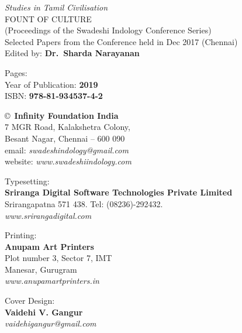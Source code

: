 \thispagestyle{empty}

\noindent
{\fontsize{9}{11}\selectfont\sl Studies in Tamil Civilisation}\\
FOUNT OF CULTURE\\
(Proceedings of the Swadeshi Indology Conference Series)\\
Selected Papers from the Conference held in Dec 2017 (Chennai)\\
Edited by: {\bf Dr.\ Sharda Narayanan}
\vfill

\noindent
Pages: {\bf\pageref{bookend}}\\
Year of Publication: {\bf 2019}\\
ISBN: {\bf 978-81-934537-4-2}\\
\vfill

\noindent
\copyright\ {\bf Infinity Foundation India}\\ 
7 MGR Road, Kalakshetra Colony,\\ 
Besant Nagar, Chennai -- 600 090\\
email: {\sl swadeshindology@gmail.com}\\
website: {\sl www.swadeshiindology.com} 
\vfill

\noindent
Typesetting:\\ 
{\bf Sriranga Digital Software Technologies Private Limited}\\ 
Srirangapatna 571 438. Tel: (08236)-292432.\\
{\sl www.srirangadigital.com}
\vfill

\noindent
Printing:\\
{\bf Anupam Art Printers}\\
Plot number 3, Sector 7, IMT\\
Manesar, Gurugram\\
{\sl www.anupamartprinters.in}
\bigskip

\noindent
Cover Design:\\ 
{\bf Vaidehi V. Gangur}\\
{\sl vaidehigangur@gmail.com}
